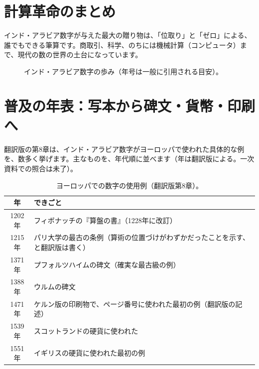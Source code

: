 \documentclass[a4paper,11pt,openany]{ltjsbook}
\begin{document}
\section{計算革命のまとめ}

インド・アラビア数字が与えた最大の贈り物は、「位取り」と「ゼロ」による、誰でもできる筆算です。商取引、科学、のちには機械計算（コンピュータ）まで、現代の数の世界の土台になっています。

\begin{figure}[htbp]
\centering
{}
\caption{インド・アラビア数字の歩み（年号は一般に引用される目安）。}
\end{figure}

\section{普及の年表：写本から碑文・貨幣・印刷へ}

翻訳版の第8章は、インド・アラビア数字がヨーロッパで使われた具体的な例を、数多く挙げます。主なものを、年代順に並べます（年は翻訳版による。一次資料での照合は未了）。

\begin{table}[htbp]
\centering
\begin{tabular}{cl}
\toprule
年 & できごと\\
\midrule
1202年 & フィボナッチの『算盤の書』（1228年に改訂）\\
1215年 & パリ大学の最古の条例（算術の位置づけがわずかだったことを示す、と翻訳版は書く）\\
1371年 & プフォルツハイムの碑文（確実な最古級の例）\\
1388年 & ウルムの碑文\\
1471年 & ケルン版の印刷物で、ページ番号に使われた最初の例（翻訳版の記述）\\
1539年 & スコットランドの硬貨に使われた\\
1551年 & イギリスの硬貨に使われた最初の例\\
\bottomrule
\end{tabular}
\caption{ヨーロッパでの数字の使用例（翻訳版第8章）。}
\end{table}
\end{document}
